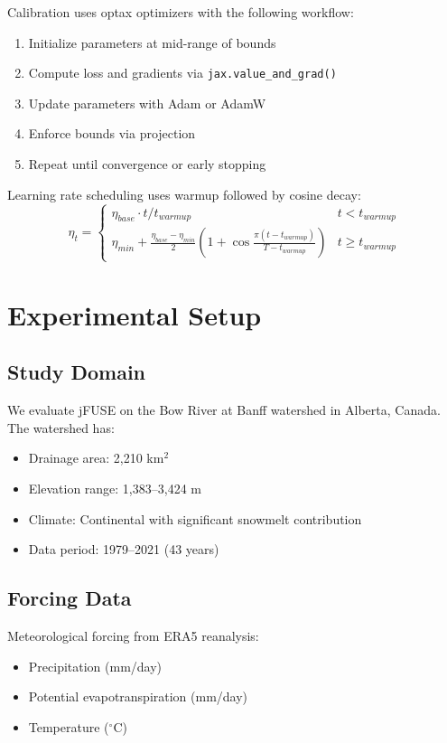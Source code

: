 \documentclass[11pt,a4paper]{article}
\begin{document}
Calibration uses optax optimizers with the following workflow:

\begin{enumerate}
    \item Initialize parameters at mid-range of bounds
    \item Compute loss and gradients via \texttt{jax.value\_and\_grad()}
    \item Update parameters with Adam or AdamW
    \item Enforce bounds via projection
    \item Repeat until convergence or early stopping
\end{enumerate}

Learning rate scheduling uses warmup followed by cosine decay:
\begin{equation}
    \eta_t = \begin{cases}
        \eta_{base} \cdot t / t_{warmup} & t < t_{warmup} \\
        \eta_{min} + \frac{\eta_{base} - \eta_{min}}{2}\left(1 + \cos\frac{\pi(t - t_{warmup})}{T - t_{warmup}}\right) & t \geq t_{warmup}
    \end{cases}
\end{equation}

\section{Experimental Setup}

\subsection{Study Domain}

We evaluate jFUSE on the Bow River at Banff watershed in Alberta, Canada. The watershed has:
\begin{itemize}
    \item Drainage area: 2,210 km$^2$
    \item Elevation range: 1,383--3,424 m
    \item Climate: Continental with significant snowmelt contribution
    \item Data period: 1979--2021 (43 years)
\end{itemize}

\subsection{Forcing Data}

Meteorological forcing from ERA5 reanalysis:
\begin{itemize}
    \item Precipitation (mm/day)
    \item Potential evapotranspiration (mm/day)
    \item Temperature ($^\circ$C)
\end{itemize}
\end{document}
